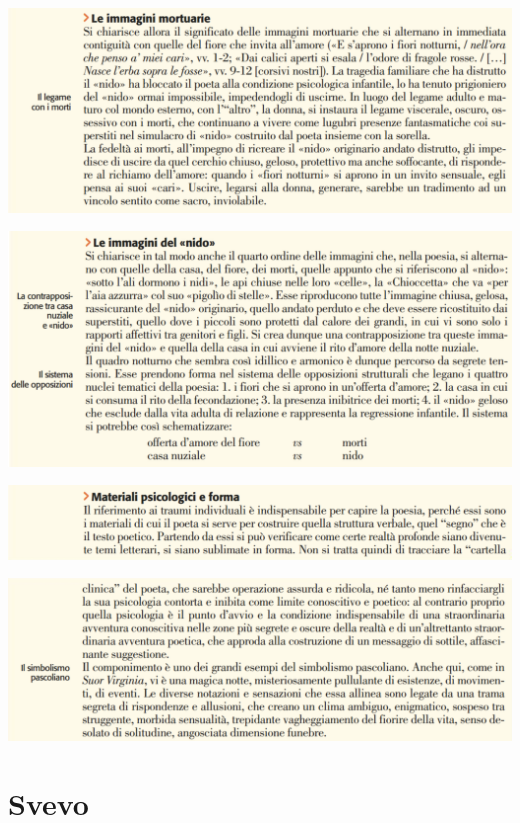 \documentclass[a4paper, twoside, titlepage]{book}
\begin{document}
\begin{center}
\includegraphics[width=\textwidth]{gelsomino3}
\end{center}

\begin{center}
\includegraphics[width=\textwidth]{gelsomino4}
\end{center}

\begin{center}
\includegraphics[width=\textwidth]{gelsomino5}
\end{center}
\vfill
\begin{center}
\includegraphics[width=\textwidth]{gelsomino6}
\end{center}

\part{Svevo}
\end{document}
